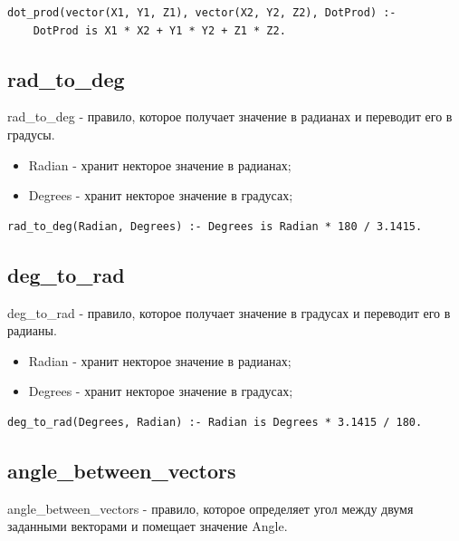 \begin{lstlisting}[caption=Реализация правила dot\_prod, label=rules:dotprod]
dot_prod(vector(X1, Y1, Z1), vector(X2, Y2, Z2), DotProd) :-
	DotProd is X1 * X2 + Y1 * Y2 + Z1 * Z2.
\end{lstlisting}

\subsection{rad\_to\_deg}
\hspace{0.6cm} rad\_to\_deg - правило, которое получает значение в радианах и переводит его в градусы.

\begin{itemize}
	\item Radian - хранит некторое значение в радианах;
	\item Degrees - хранит некторое значение в градусах;
\end{itemize}

\begin{lstlisting}[caption=Реализация правила rad\_to\_deg, label=rules:radtodeg]
rad_to_deg(Radian, Degrees) :- Degrees is Radian * 180 / 3.1415.
\end{lstlisting}
\subsection{deg\_to\_rad}
\hspace{0.6cm} deg\_to\_rad - правило, которое получает значение в градусах и переводит его в радианы.

\begin{itemize}
	\item Radian - хранит некторое значение в радианах;
	\item Degrees - хранит некторое значение в градусах;
\end{itemize}

\begin{lstlisting}[caption=Реализация правила deg\_to\_rad, label=rules:degtorad]
deg_to_rad(Degrees, Radian) :- Radian is Degrees * 3.1415 / 180.
\end{lstlisting}

\subsection{angle\_between\_vectors}
\hspace{0.6cm} angle\_between\_vectors - правило, которое определяет угол между двумя заданными векторами и помещает значение Angle.

